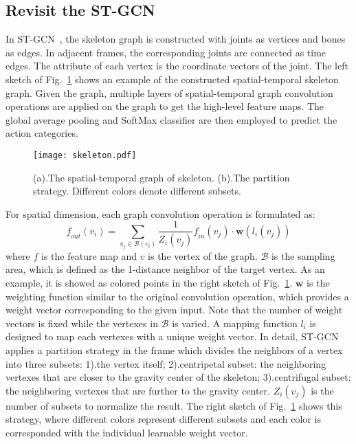 \documentclass[10pt,twocolumn,letterpaper]{article}
\begin{document}
	\subsection{Revisit the ST-GCN}
   	\label{gcn}
    In ST-GCN~\cite{yan_spatial_2018}, the skeleton graph is constructed with joints as vertices and bones as edges. In adjacent frames, the corresponding joints are connected as time edges. The attribute of each vertex is the coordinate vectors of the joint. The left sketch of Fig.~\ref{fig:skeleton} shows an example of the constructed spatial-temporal skeleton graph. Given the graph, multiple layers of spatial-temporal graph convolution operations are applied on the graph to get the high-level feature maps. The global average pooling and SoftMax classifier are then employed to predict the action categories.
    
    \begin{figure}[!htb]
	\centering
	\texttt{[image: skeleton.pdf]}
	\caption{(a).The spatial-temporal graph of skeleton. (b).The partition strategy. Different colors denote different subsets.}
	\label{fig:skeleton}
	\end{figure}

     For spatial dimension, each graph convolution operation is formulated as:
\begin{equation}
    \label{eq:stgcn}
    \mathit{f}_{out}(v_{i})=\sum_{v_{j}\in \mathcal{B}(v_{i})} \frac{1}{Z_{i}(v_{j}) } \mathit{f}_{in}(v_{j})\cdot{}\textbf{w}(l_{i}(v_{j}))
    \end{equation}
    where $\mathit{f}$ is the feature map and $v$ is the vertex of the graph. $\mathcal{B}$ is the sampling area, which is defined as the 1-distance neighbor of the target vertex. As an example, it is showed as colored points in the right sketch of Fig.~\ref{fig:skeleton}. $\textbf{w}$ is the weighting function similar to the original convolution operation, which provides a weight vector corresponding to the given input. Note that the number of weight vectors is fixed while the vertexes in $\mathcal{B}$ is varied. A mapping function $l_{i}$ is designed to map each vertexes with a unique weight vector. In detail, ST-GCN applies a partition strategy in the frame which divides the neighbors of a vertex into three subsets: 1).the vertex itself; 2).centripetal subset: the neighboring vertexes that are closer to the gravity center of the skeleton; 3).centrifugal subset: the neighboring vertexes that are further to the gravity center. $Z_{i}(v_{j})$ is the number of subsets to normalize the result. The right sketch of Fig.~\ref{fig:skeleton} shows this strategy, where different colors represent different subsets and each color is corresponded with the individual learnable weight vector.
    
\end{document}
